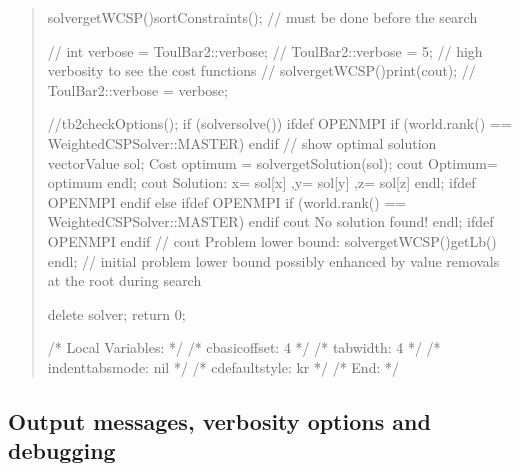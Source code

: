 \documentclass[letterpaper,10pt,openany,oneside,english]{sphinxmanual}
\begin{document}
\begin{quote}
\begin{sphinxVerbatim}[commandchars=\\\{\}]
    solver\PYGZhy{}\PYGZgt{}getWCSP()\PYGZhy{}\PYGZgt{}sortConstraints(); // must be done before the search

    //	int verbose = ToulBar2::verbose;
    //	ToulBar2::verbose = 5;  // high verbosity to see the cost functions
    //	solver\PYGZhy{}\PYGZgt{}getWCSP()\PYGZhy{}\PYGZgt{}print(cout);
    //	ToulBar2::verbose = verbose;

    //tb2checkOptions();
    if (solver\PYGZhy{}\PYGZgt{}solve()) \PYGZob{}
\PYGZsh{}ifdef OPENMPI
        if (world.rank() == WeightedCSPSolver::MASTER) \PYGZob{}
\PYGZsh{}endif
            // show optimal solution
            vector\PYGZlt{}Value\PYGZgt{} sol;
            Cost optimum = solver\PYGZhy{}\PYGZgt{}getSolution(sol);
            cout \PYGZlt{}\PYGZlt{} \PYGZdq{}Optimum=\PYGZdq{} \PYGZlt{}\PYGZlt{} optimum \PYGZlt{}\PYGZlt{} endl;
            cout \PYGZlt{}\PYGZlt{} \PYGZdq{}Solution: x=\PYGZdq{} \PYGZlt{}\PYGZlt{} sol[x] \PYGZlt{}\PYGZlt{} \PYGZdq{} ,y=\PYGZdq{} \PYGZlt{}\PYGZlt{} sol[y] \PYGZlt{}\PYGZlt{} \PYGZdq{} ,z=\PYGZdq{} \PYGZlt{}\PYGZlt{} sol[z] \PYGZlt{}\PYGZlt{} endl;
\PYGZsh{}ifdef OPENMPI
        \PYGZcb{}
\PYGZsh{}endif
    \PYGZcb{} else \PYGZob{}
\PYGZsh{}ifdef OPENMPI
        if (world.rank() == WeightedCSPSolver::MASTER) \PYGZob{}
\PYGZsh{}endif
            cout \PYGZlt{}\PYGZlt{} \PYGZdq{}No solution found!\PYGZdq{} \PYGZlt{}\PYGZlt{} endl;
\PYGZsh{}ifdef OPENMPI
        \PYGZcb{}
\PYGZsh{}endif
    \PYGZcb{}
    // cout \PYGZlt{}\PYGZlt{} \PYGZdq{}Problem lower bound: \PYGZdq{} \PYGZlt{}\PYGZlt{} solver\PYGZhy{}\PYGZgt{}getWCSP()\PYGZhy{}\PYGZgt{}getLb() \PYGZlt{}\PYGZlt{} endl; // initial problem lower bound possibly enhanced by value removals at the root during search

    delete solver;
    return 0;
\PYGZcb{}

/* Local Variables: */
/* c\PYGZhy{}basic\PYGZhy{}offset: 4 */
/* tab\PYGZhy{}width: 4 */
/* indent\PYGZhy{}tabs\PYGZhy{}mode: nil */
/* c\PYGZhy{}default\PYGZhy{}style: \PYGZdq{}k\PYGZam{}r\PYGZdq{} */
/* End: */
\end{sphinxVerbatim}
\end{quote}


\subsection{Output messages, verbosity options and debugging}
\label{\detokenize{ref/ref_modules:output-messages-verbosity-options-and-debugging}}
\end{document}
